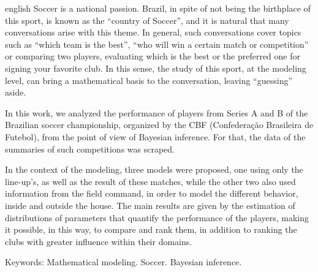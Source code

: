 \begin{resumo}[Abstract]
    \begin{otherlanguage*}{english}
        Soccer is a national passion. Brazil, in spite of not being the birthplace of this sport, is known as the ``country of Soccer'', and it is natural that many conversations arise with this theme. In general, such conversations cover topics such as ``which team is the best'', ``who will win a certain match or competition'' or comparing two players, evaluating which is the best or the preferred one for signing your favorite club. In this sense, the study of this sport, at the modeling level, can bring a mathematical basis to the conversation, leaving ``guessing'' aside.

        In this work, we analyzed the performance of players from Series A and B of the Brazilian soccer championship, organized by the CBF (Confederação Brasileira de Futebol), from the point of view of Bayesian inference. For that, the data of the summaries of such competitions was scraped.
        
        In the context of the modeling, three models were proposed, one using only the line-up's, as well as the result of these matches, while the other two also used information from the field command, in order to model the different behavior, inside and outside the house. The main results are given by the estimation of distributions of parameters that quantify the performance of the players, making it possible, in this way, to compare and rank them, in addition to ranking the clubs with greater influence within their domains.
    \end{otherlanguage*}

Keywords: Mathematical modeling. Soccer. Bayesian inference.
\end{resumo}